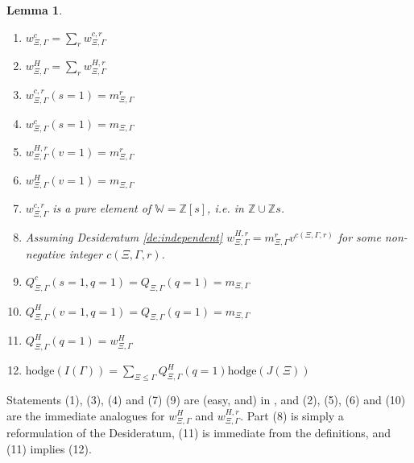 \documentclass[12pt,leqno]{article}
\newtheorem{lemma}[equation]{Lemma}
\newcommand{\hodge}{\text{hodge}}
\newcommand{\Z}{\mathbb Z}
\newcommand{\W}{\mathbb W}
\begin{document}
\begin{lemma}\hfil
\label{l:formal}
\begin{enumerate}
\item $w^c_{\Xi,\Gamma}=\sum_r w^{c,r}_{\Xi,\Gamma}$
\item $w^H_{\Xi,\Gamma}=\sum_r w^{H,r}_{\Xi,\Gamma}$
\item $w^{c,r}_{\Xi,\Gamma}(s=1)=m^r_{\Xi,\Gamma}$
\item $w^{c}_{\Xi,\Gamma}(s=1)=m_{\Xi,\Gamma}$
\item $w^{H,r}_{\Xi,\Gamma}(v=1)=m^r_{\Xi,\Gamma}$
\item $w^{H}_{\Xi,\Gamma}(v=1)=m_{\Xi,\Gamma}$
\item $w^{c,r}_{\Xi,\Gamma}$ is a pure element of $\W=\Z[s]$, i.e. in $\Z\cup \Z s$.
\item Assuming Desideratum \ref{de:independent} $w^{H,r}_{\Xi,\Gamma}=m^r_{\Xi,\Gamma}v^{c(\Xi,\Gamma,r)}$ for some non-negative integer $c(\Xi,\Gamma,r)$.
\item $Q^c_{\Xi,\Gamma}(s=1,q=1)=Q_{\Xi,\Gamma}(q=1)=m_{\Xi,\Gamma}$
\item $Q^H_{\Xi,\Gamma}(v=1,q=1)=Q_{\Xi,\Gamma}(q=1)=m_{\Xi,\Gamma}$
\item $Q^H_{\Xi,\Gamma}(q=1)=w^H_{\Xi,\Gamma}$
\item {\normalfont $\hodge(I(\Gamma))=\sum_{\Xi\le\Gamma}Q^H_{\Xi,\Gamma}(q=1)\hodge(J(\Xi))$}

\end{enumerate}
\end{lemma}

Statements (1), (3), (4) and (7) (9) are (easy, and) in \cite{unitaryDual}, and (2), (5), (6)  and (10)
are the immediate analogues for $w^H_{\Xi,\Gamma}$ and
$w^{H,r}_{\Xi,\Gamma}$. Part (8) is simply a reformulation of the Desideratum, (11) is immediate from the definitions, and (11) implies (12).












\end{document}
